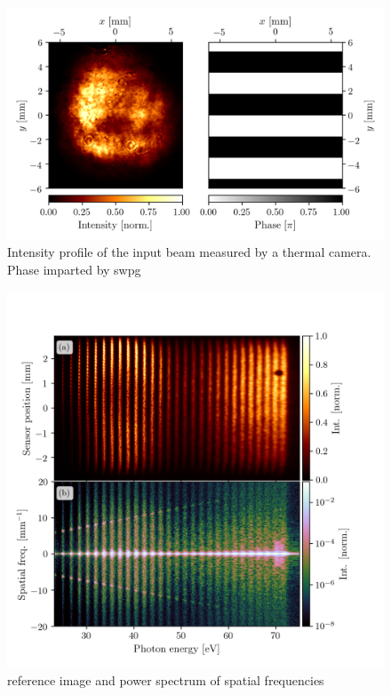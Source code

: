 \begin{figure}
	\centering
	\includegraphics[width=1.0\textwidth]{figures/Two_source/LP_images.png}
	\caption{Intensity profile of the input beam measured by a thermal camera. Phase imparted by \gls{swpg}}
	\label{fig:LP_inputs}
\end{figure}


\begin{figure}
	\centering
	\includegraphics[width=1.0\textwidth]{figures/Two_source/ref_img_pow_spec.png}
	\caption{reference image and power spectrum of spatial frequencies}
	\label{fig:ref_img_pow_spec}
\end{figure}


